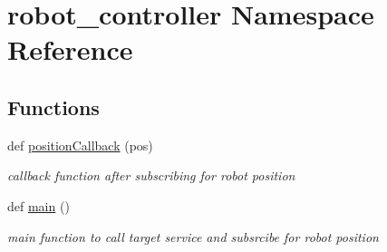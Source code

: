 \hypertarget{namespacerobot__controller}{}\section{robot\+\_\+controller Namespace Reference}
\label{namespacerobot__controller}
\subsection*{Functions}
\begin{DoxyCompactItemize}
\item 
def \hyperlink{namespacerobot__controller_ad432a00343321fec384e1e79b142ac5a}{position\+Callback} (pos)
\begin{DoxyCompactList}\small\item\em callback function after subscribing for robot position \end{DoxyCompactList}\item 
def \hyperlink{namespacerobot__controller_accbf10a6a15201c2588764d5481947e7}{main} ()
\begin{DoxyCompactList}\small\item\em main function to call target service and subsrcibe for robot position \end{DoxyCompactList}\end{DoxyCompactItemize}
